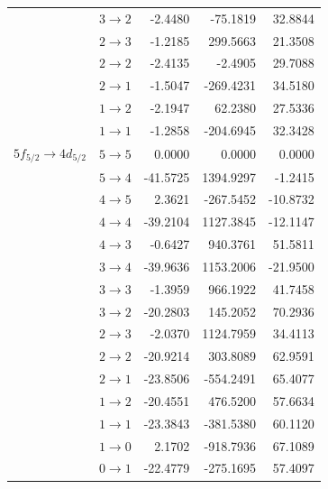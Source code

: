\begin{longtable}{c c | r r r}
& $3 \rightarrow 2$ & -2.4480 & -75.1819 & 32.8844 \\
& $2 \rightarrow 3$ & -1.2185 & 299.5663 & 21.3508 \\
& $2 \rightarrow 2$ & -2.4135 & -2.4905 & 29.7088 \\
& $2 \rightarrow 1$ & -1.5047 & -269.4231 & 34.5180 \\
& $1 \rightarrow 2$ & -2.1947 & 62.2380 & 27.5336 \\
& $1 \rightarrow 1$ & -1.2858 & -204.6945 & 32.3428 \\[7pt]
$5f_{5/2} \rightarrow 4d_{5/2}$ & $5 \rightarrow 5$ & 0.0000 & 0.0000 & 0.0000 \\
& $5 \rightarrow 4$ & -41.5725 & 1394.9297 & -1.2415 \\
& $4 \rightarrow 5$ & 2.3621 & -267.5452 & -10.8732 \\
& $4 \rightarrow 4$ & -39.2104 & 1127.3845 & -12.1147 \\
& $4 \rightarrow 3$ & -0.6427 & 940.3761 & 51.5811 \\
& $3 \rightarrow 4$ & -39.9636 & 1153.2006 & -21.9500 \\
& $3 \rightarrow 3$ & -1.3959 & 966.1922 & 41.7458 \\
& $3 \rightarrow 2$ & -20.2803 & 145.2052 & 70.2936 \\
& $2 \rightarrow 3$ & -2.0370 & 1124.7959 & 34.4113 \\
& $2 \rightarrow 2$ & -20.9214 & 303.8089 & 62.9591 \\
& $2 \rightarrow 1$ & -23.8506 & -554.2491 & 65.4077 \\
& $1 \rightarrow 2$ & -20.4551 & 476.5200 & 57.6634 \\
& $1 \rightarrow 1$ & -23.3843 & -381.5380 & 60.1120 \\
& $1 \rightarrow 0$ & 2.1702 & -918.7936 & 67.1089 \\
& $0 \rightarrow 1$ & -22.4779 & -275.1695 & 57.4097
\end{longtable}%
%
%
%
